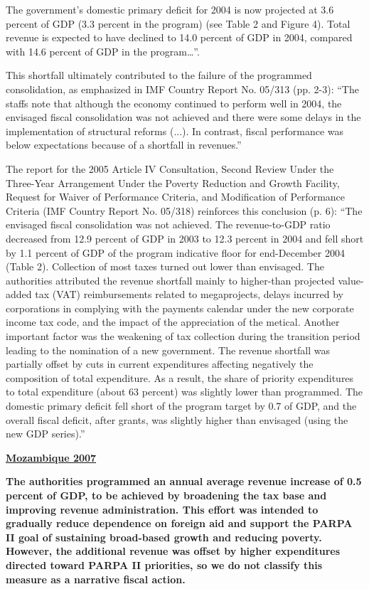 The government’s domestic primary deficit for 2004 is now projected at 3.6 percent of GDP (3.3 percent in the program) (see Table 2 and Figure 4). Total revenue is expected to have declined to 14.0 percent of GDP in 2004, compared with 14.6 percent of GDP in the program…”.

This shortfall ultimately contributed to the failure of the programmed consolidation, as emphasized in IMF Country Report No. 05/313 (pp. 2-3): “The staffs note that although the economy continued to perform well in 2004, the envisaged fiscal consolidation was not achieved and there were some delays in the implementation of structural reforms (...). In contrast, fiscal performance was below expectations because of a shortfall in revenues.”

The report for the 2005 Article IV Consultation, Second Review Under the Three-Year Arrangement Under the Poverty Reduction and Growth Facility, Request for Waiver of Performance Criteria, and Modification of Performance Criteria (IMF Country Report No. 05/318) reinforces this conclusion (p. 6): “The envisaged fiscal consolidation was not achieved. The revenue-to-GDP ratio decreased from 12.9 percent of GDP in 2003 to 12.3 percent in 2004 and fell short by 1.1 percent of GDP of the program indicative floor for end-December 2004 (Table 2). Collection of most taxes turned out lower than envisaged. The authorities attributed the revenue shortfall mainly to higher-than projected value-added tax (VAT) reimbursements related to megaprojects, delays incurred by corporations in complying with the payments calendar under the new corporate income tax code, and the impact of the appreciation of the metical. Another important factor was the weakening of tax collection during the transition period leading to the nomination of a new government. The revenue shortfall was partially offset by cuts in current expenditures affecting negatively the composition of total expenditure. As a result, the share of priority expenditures to total expenditure (about 63 percent) was slightly lower than programmed. The domestic primary deficit fell short of the program target by 0.7 of GDP, and the overall fiscal deficit, after grants, was slightly higher than envisaged (using the new GDP series).”

\textbf{\underline{Mozambique 2007}}

\textbf{The authorities programmed an annual average revenue increase of 0.5 percent of GDP, to be achieved by broadening the tax base and improving revenue administration. This effort  was intended to gradually reduce dependence on foreign aid and support the PARPA II  goal of sustaining broad-based growth and reducing poverty. However, the additional revenue was offset by higher expenditures directed toward PARPA II priorities, so we do not classify this measure as a narrative fiscal action.} 
  
